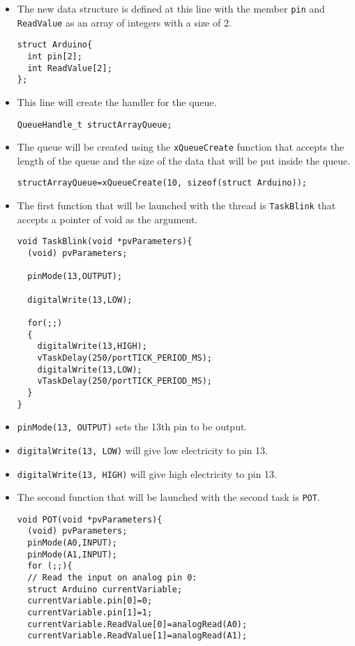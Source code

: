 \documentclass{article}
\begin{document}
\begin{itemize}
    \item The new data structure is defined at this line with the member \texttt{pin} and \texttt{ReadValue} as an array of integers with a size of 2.
\begin{lstlisting}[style=cpp]
struct Arduino{
  int pin[2];
  int ReadValue[2];
};
\end{lstlisting}

    \item This line will create the handler for the queue.
\begin{lstlisting}[style=cpp]
QueueHandle_t structArrayQueue;
\end{lstlisting}

    \item The queue will be created using the \texttt{xQueueCreate} function that accepts the length of the queue and the size of the data that will be put inside the queue.
\begin{lstlisting}[style=cpp]
structArrayQueue=xQueueCreate(10, sizeof(struct Arduino));
\end{lstlisting}

    \item The first function that will be launched with the thread is \texttt{TaskBlink} that accepts a pointer of void as the argument.
\begin{lstlisting}[style=cpp]
void TaskBlink(void *pvParameters){
  (void) pvParameters;
  
  pinMode(13,OUTPUT);
  
  digitalWrite(13,LOW);
  
  for(;;)
  {
    digitalWrite(13,HIGH);
    vTaskDelay(250/portTICK_PERIOD_MS);
    digitalWrite(13,LOW);
    vTaskDelay(250/portTICK_PERIOD_MS);
  }
}
\end{lstlisting}

    \item \texttt{pinMode(13, OUTPUT)} sets the 13th pin to be output.
    \item \texttt{digitalWrite(13, LOW)} will give low electricity to pin 13.
    \item \texttt{digitalWrite(13, HIGH)} will give high electricity to pin 13.

    \item The second function that will be launched with the second task is \texttt{POT}.
\begin{lstlisting}[style=cpp]
void POT(void *pvParameters){
  (void) pvParameters;
  pinMode(A0,INPUT);
  pinMode(A1,INPUT);
  for (;;){
  // Read the input on analog pin 0:
  struct Arduino currentVariable;
  currentVariable.pin[0]=0;
  currentVariable.pin[1]=1;
  currentVariable.ReadValue[0]=analogRead(A0);
  currentVariable.ReadValue[1]=analogRead(A1);  


\end{lstlisting}
\end{itemize}
\end{document}
